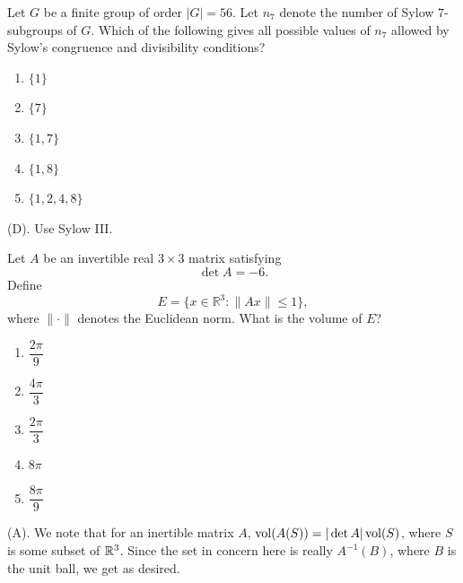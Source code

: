 \begin{exercise}
Let $G$ be a finite group of order $|G| = 56$. Let $n_7$ denote the number of Sylow
$7$-subgroups of $G$.
Which of the following gives all possible values of $n_7$ allowed by Sylow's
congruence and divisibility conditions?
\begin{enumerate}[label=(\Alph*)]
    \item $\{1\}$
    \item $\{7\}$
    \item $\{1,7\}$
    \item $\{1,8\}$
    \item $\{1,2,4,8\}$
\end{enumerate}
\end{exercise}
\begin{solution}
(D). Use Sylow III.
\end{solution}


\begin{exercise}
Let $A$ be an invertible real $3\times3$
matrix satisfying
\[
\det A=-6.
\]
Define
\[
E=\{x\in\mathbb R^3:\|Ax\|\le1\},
\]
where $\|\cdot\|$ denotes the Euclidean norm. What is the volume of $E$?
\begin{enumerate}[label=(\Alph*)]
    \item $\dfrac{2\pi}{9}$
    \item $\dfrac{4\pi}{3}$
    \item $\dfrac{2\pi}{3}$
    \item $8\pi$
    \item $\dfrac{8\pi}{9}$
\end{enumerate}
\end{exercise}
\begin{solution}
(A). We note that for an inertible matrix $A$, $\operatorname{vol}(A(S)) = |\det A| \operatorname{vol}(S)$, 
where $S$ is some subset of $\mathbb{R}^3$. Since the set in concern here is really $A^{-1}(B)$,
where $B$ is the unit ball, we get as desired.
\end{solution}



